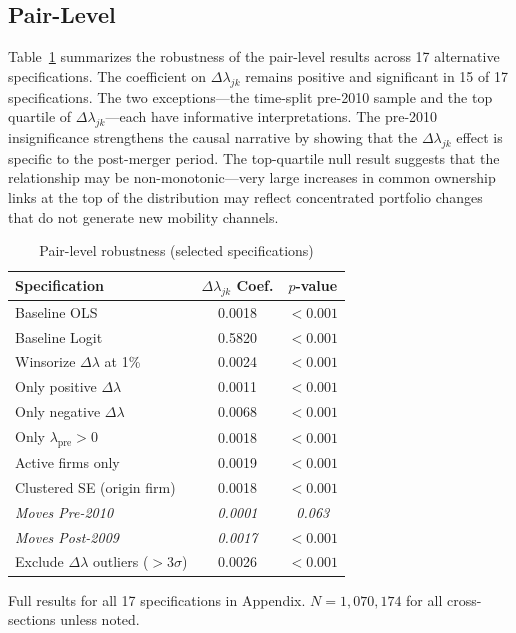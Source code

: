 \documentclass[11pt,a4paper]{article}
\begin{document}
\subsection{Pair-Level}

Table~\ref{tab:robust} summarizes the robustness of the pair-level results across 17 alternative specifications. The coefficient on $\Delta\lambda_{jk}$ remains positive and significant in 15 of 17 specifications. The two exceptions---the time-split pre-2010 sample and the top quartile of $\Delta\lambda_{jk}$---each have informative interpretations. The pre-2010 insignificance strengthens the causal narrative by showing that the $\Delta\lambda_{jk}$ effect is specific to the post-merger period. The top-quartile null result suggests that the relationship may be non-monotonic---very large increases in common ownership links at the top of the distribution may reflect concentrated portfolio changes that do not generate new mobility channels.

\begin{table}[h!]
\centering
\begin{threeparttable}
\begin{tabular}{lcc}
\toprule
\textbf{Specification} & \textbf{$\Delta\lambda_{jk}$ Coef.} & \textbf{$p$-value} \\
\midrule
Baseline OLS & 0.0018 & $<0.001$ \\
Baseline Logit & 0.5820 & $<0.001$ \\
Winsorize $\Delta\lambda$ at 1\% & 0.0024 & $<0.001$ \\
Only positive $\Delta\lambda$ & 0.0011 & $<0.001$ \\
Only negative $\Delta\lambda$ & 0.0068 & $<0.001$ \\
Only $\lambda_{\text{pre}} > 0$ & 0.0018 & $<0.001$ \\
Active firms only & 0.0019 & $<0.001$ \\
Clustered SE (origin firm) & 0.0018 & $<0.001$ \\
\textit{Moves Pre-2010} & \textit{0.0001} & \textit{0.063} \\
\textit{Moves Post-2009} & \textit{0.0017} & \textit{$<0.001$} \\
Exclude $\Delta\lambda$ outliers ($>3\sigma$) & 0.0026 & $<0.001$ \\
\bottomrule
\end{tabular}
\begin{tablenotes}
\footnotesize
\item Full results for all 17 specifications in Appendix. $N=1{,}070{,}174$ for all cross-sections unless noted.
\end{tablenotes}
\end{threeparttable}
\caption{Pair-level robustness (selected specifications)}
\label{tab:robust}
\end{table}
\end{document}
